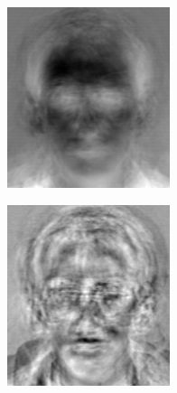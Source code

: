\begin{figure}[H] %
\centering
\begin{subfigure}{.32\textwidth}
    \centering
    \includegraphics[width=\textwidth]{figures/eigenface0.png}
\end{subfigure}
%
\begin{subfigure}{.32\textwidth}
    \centering
    \includegraphics[width=\textwidth]{figures/eigenface49.png}

\end{subfigure}
\end{figure}
